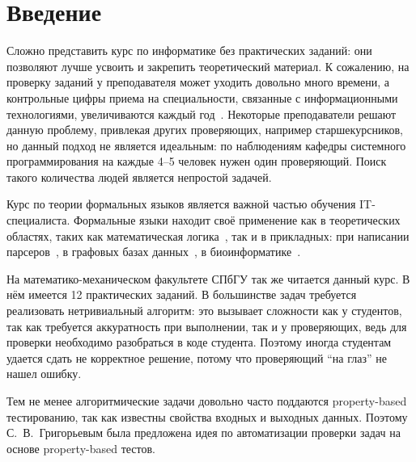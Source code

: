 
\section*{Введение}
\thispagestyle{withCompileDate}

Сложно представить курс по информатике без практических заданий: они позволяют лучше усвоить и закрепить теоретический материал.
К сожалению, на проверку заданий у преподавателя может уходить довольно много времени, а контрольные цифры приема на специальности, связанные с информационными технологиями, увеличиваются каждый год~\cite{2024GoduKolichestvo}.
Некоторые преподаватели решают данную проблему, привлекая других проверяющих, например старшекурсников, но данный подход не является идеальным: по наблюдениям кафедры системного программирования на каждые 4--5 человек нужен один проверяющий.
Поиск такого количества людей является непростой задачей.

Курс по теории формальных языков является важной частью обучения IT-специалиста.
Формальные языки находит своё применение как в теоретических областях, таких как математическая логика~\cite{guhaParikhAutomataInfinite2022,draghiciSemEnovArithmetic2023a}, так и в прикладных: при написании парсеров~\cite{gruneParsingTechniques2008}, в графовых базах данных~\cite{hellingsQueryingPathsGraphs2016,noleRegularPathQueries2016}, в биоинформатике~\cite{dyrkaEstimatingProbabilisticContextfree2019,wjandersonEvolvingStochasticContext2012}.

На математико-механическом факультете СПбГУ так же читается данный курс.
В нём имеется 12 практических заданий.
В большинстве задач требуется реализовать нетривиальный алгоритм: это вызывает сложности как у студентов, так как требуется аккуратность при выполнении, так и у проверяющих, ведь для проверки необходимо разобраться в коде студента.
Поэтому иногда студентам удается сдать не корректное решение, потому что проверяющий \enquote{на глаз} не нашел ошибку.

Тем не менее алгоритмические задачи довольно часто поддаются property-based тестированию, так как известны свойства входных и выходных данных.
Поэтому С.~В.~Григорьевым была предложена идея по автоматизации проверки задач на основе property-based тестов.
